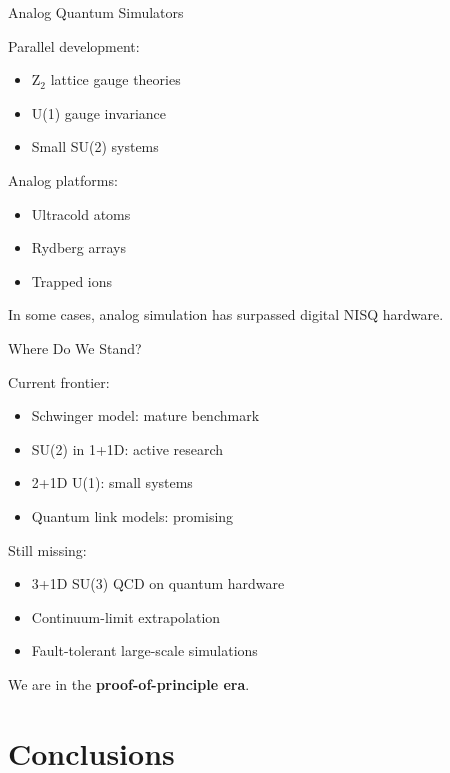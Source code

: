 \documentclass[11pt]{beamer}
\begin{document}
\begin{frame}{Analog Quantum Simulators}

Parallel development:

\begin{itemize}
\item Z$_2$ lattice gauge theories
\item U(1) gauge invariance
\item Small SU(2) systems
\end{itemize}

Analog platforms:

\begin{itemize}
\item Ultracold atoms
\item Rydberg arrays
\item Trapped ions
\end{itemize}

In some cases, analog simulation has surpassed digital NISQ hardware.
\end{frame}

\begin{frame}{Where Do We Stand?}

Current frontier:

\begin{itemize}
\item Schwinger model: mature benchmark
\item SU(2) in 1+1D: active research
\item 2+1D U(1): small systems
\item Quantum link models: promising
\end{itemize}

Still missing:

\begin{itemize}
\item 3+1D SU(3) QCD on quantum hardware
\item Continuum-limit extrapolation
\item Fault-tolerant large-scale simulations
\end{itemize}

We are in the \textbf{proof-of-principle era}.
\end{frame}

\section{Conclusions}
\end{document}
